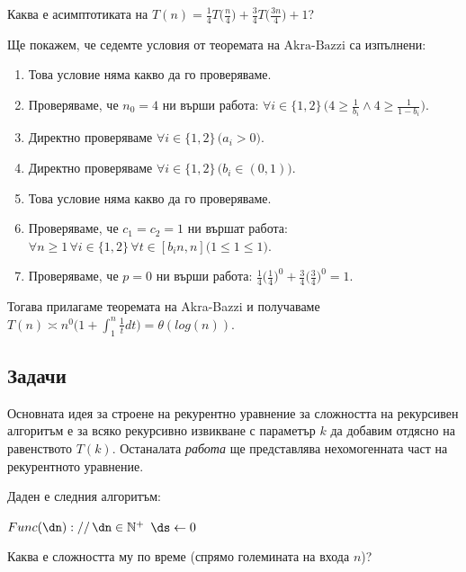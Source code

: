\hypersetup{linkcolor=mydarkblue}

\begin{problem}
Каква е асимптотиката на $T(n)=\frac14T\big(\frac n4\big)+\frac34T\big(\frac{3n}4\big)+1$? 
\end{problem}

\begin{solution}
	Ще покажем, че седемте условия от $\hyperref[th:akra-bazzi]{\text{теоремата на Akra-Bazzi}}$ са изпълнени:
	\begin{enumerate}
		\item Това условие няма какво да го проверяваме.
		\vspace{-0.15cm}
		\item Проверяваме, че $n_0=4$ ни върши работа: $\forall i\in\{1,2\}\,\Big(4\ge\frac1{b_i}\land 4\ge\frac1{1-b_i}\Big)$.
		\vspace{-0.15cm}
		\item Директно проверяваме $\forall i\in\{1,2\}\,\big(a_i>0\big)$.
		\item Директно проверяваме $\forall i\in\{1,2\}\,\big(b_i\in(0,1)\big)$.
		\item Това условие няма какво да го проверяваме.
		\item Проверяваме, че $c_1=c_2=1$ ни вършат работа: $\forall n\ge1\,\forall i\in\{1,2\}\,\forall t\in[b_in,n]\big(1\le1\le1\big)$.
		\vspace{-0.5cm}
		\item Проверяваме, че $p=0$ ни върши работа: $\frac14\big(\frac14\big)^0+\frac34\big(\frac34\big)^0=1$.
	\end{enumerate}
	\vspace{-0.2cm}
	Тогава прилагаме теоремата на Akra-Bazzi и получаваме $T(n)\asymp n^0\bigg(1+\displaystyle\int_1^n\frac1tdt\bigg)=\theta(log(n))$.
\end{solution}\leavevmode\newline


\subsection{Задачи}

Основната идея за строене на рекурентно уравнение за сложността на рекурсивен алгоритъм е за всяко рекурсивно извикване с параметър $k$ да добавим отдясно на равенството $T(k)$. Останалата \emph{работа} ще представлява нехомогенната част на рекурентното уравнение.\\

\begin{problem}
	Даден е следния алгоритъм:
	\begin{pseudocode}
		
		
		$Func(\dn)://\,\dn\in\mathbb{N}^+$
		\Mybegin
		{
			$\ds\leftarrow0$\;
			\KwRet{$\ds$}\;
		}
	\end{pseudocode}
	Каква е сложността му по време (спрямо големината на входа $n$)?
\end{problem}

